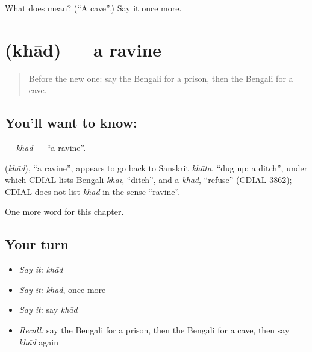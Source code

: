 \begin{tcolorbox}[breakable,colback=teal!4,colframe=teal!35!black,title={Before you move on}]
What does  mean? (\textquotedblleft{}A cave\textquotedblright{}.) Say it once more.
\end{tcolorbox}
\section[\texorpdfstring{\bn{খাদ} (khād)}{খাদ (khād)}]{ (khād) — a ravine}

\label{lesson:BN-C189-khad}



\begin{quote}
Before the new one: say the Bengali for a prison, then the Bengali for a cave.
\end{quote}

\subsection*{You'll want to know: }
\textbf{} — \emph{khād} — \textquotedblleft{}a ravine\textquotedblright{}.

\begin{cousinweb}
\textbf{} (\emph{khād}), \textquotedblleft{}a ravine\textquotedblright{}, appears to go back to Sanskrit \emph{khāta}, \textquotedblleft{}dug up; a ditch\textquotedblright{}, under which CDIAL lists Bengali \emph{khāī}, \textquotedblleft{}ditch\textquotedblright{}, and a \emph{khād}, \textquotedblleft{}refuse\textquotedblright{} (CDIAL 3862); CDIAL does not list \emph{khād} in the sense \textquotedblleft{}ravine\textquotedblright{}.
\end{cousinweb}

\begin{grammarlens}[title={What you've built}]
One more word for this chapter.
\end{grammarlens}

\subsection*{Your turn}
\begin{itemize}
\raggedright
  \item \emph{Say it:} \emph{khād}
  \item \emph{Say it:} \emph{khād}, once more
  \item \emph{Say it:} say \emph{khād}
  \item \emph{Recall:} say the Bengali for a prison, then the Bengali for a cave, then say \emph{khād} again
\end{itemize}

